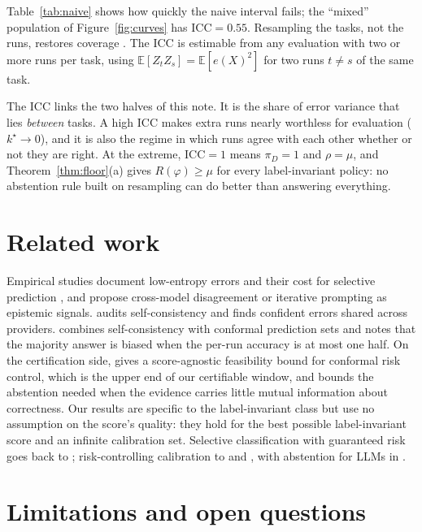 \documentclass[11pt]{article}
\theoremstyle{definition}
\newcommand{\E}{\mathbb{E}}
\begin{document}
Table~\ref{tab:naive} shows how quickly the naive interval fails; the ``mixed'' population of
Figure~\ref{fig:curves} has $\mathrm{ICC}=0.55$. Resampling the tasks, not the runs, restores
coverage \citep{miller2024errorbars}. The ICC is estimable from any evaluation with two or more runs
per task, using $\E[Z_tZ_s]=\E[e(X)^2]$ for two runs $t\neq s$ of the same task.

The ICC links the two halves of this note. It is the share of error variance that lies
\emph{between} tasks. A high ICC makes extra runs nearly worthless for evaluation ($k^\star\to 0$),
and it is also the regime in which runs agree with each other whether or not they are right. At
the extreme, $\mathrm{ICC}=1$ means $\pi_D=1$ and $\rho=\mu$, and Theorem~\ref{thm:floor}(a) gives
$R(\varphi)\ge\mu$ for every label-invariant policy: no abstention rule built on resampling can do
better than answering everything.

\section{Related work}

Empirical studies document low-entropy errors and their cost for selective prediction
\citep{phillips2026entropy,kossen2024probes}, and propose cross-model disagreement
\citep{hamidieh2026complementing} or iterative prompting \citep{yadkori2024believe} as epistemic
signals. \citet{ding2026agree} audits self-consistency and finds confident errors shared across
providers. \citet{mouzouni2026blackbox} combines self-consistency with conformal prediction sets
and notes that the majority answer is biased when the per-run accuracy is at most one half.
On the certification side, \citet{kotte2026crc} gives a score-agnostic feasibility bound for
conformal risk control, which is the upper end of our certifiable window, and
\citet{akter2025lift} bounds the abstention needed when the evidence carries little mutual
information about correctness. Our results are specific to the label-invariant class but use no
assumption on the score's quality: they hold for the best possible label-invariant score and an
infinite calibration set. Selective classification with guaranteed risk goes back to
\citet{geifman2017selective}; risk-controlling calibration to \citet{angelopoulos2021ltt} and
\citet{angelopoulos2024crc}, with abstention for LLMs in \citet{yadkori2024conformal}.

\section{Limitations and open questions}
\end{document}
